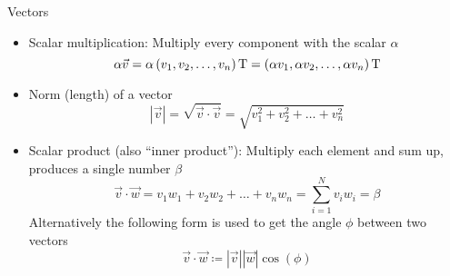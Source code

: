   \begin{frame}{Vectors}
    \begin{itemize}
      \item Scalar multiplication:
        Multiply every component with the scalar $\alpha$
        \begin{equation*}
          \alpha \vec{v} =
            \alpha \left(v_1, v_2, \dots, v_n\right)\text{T} =
            \left(\alpha v_1, \alpha v_2, \dots, \alpha v_n\right)\text{T}
        \end{equation*}
      \item Norm (length) of a vector
        \begin{equation*}
          |\vec{v}| = \sqrt{\vec{v}\cdot \vec{v}} =
            \sqrt{v_1^2 + v_2^2 + \dots + v_n^2}
        \end{equation*}
      \item Scalar product (also \enquote{inner product}):
        Multiply each element and sum up, produces a single number $\beta$
        \begin{equation*}
          \vec{v}\cdot \vec{w} =
            v_1 w_1 + v_2 w_2 + \dots + v_n w_n =
            \sum_{i=1}^{N} v_i w_i = \beta
        \end{equation*}
        Alternatively the following form is used to get the angle $\phi$
          between two vectors
        \begin{equation*}
          \vec{v}\cdot \vec{w} \coloneqq |\vec{v}||\vec{w}|\cos(\phi)
        \end{equation*}

    \end{itemize}
  \end{frame}

